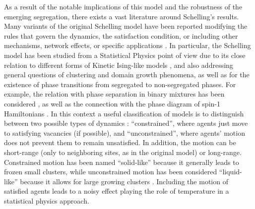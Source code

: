 As a result of the notable implications of this model and the robustness of the emerging segregation, there exists a vast literature around Schelling's results. Many variants of the original Schelling model have been reported modifying the rules that govern the dynamics, the satisfaction condition, or including other mechanisms, network effects, or specific applications \cite{Vinkovic,stauffer-2007,Dall_Asta_2008,gracia-lazaro-2009,Gauvin_2009,Gauvin_2010,domic-2011,henry-2011,unified,Interfacial_roughening,stauffer-2013,lenormand-2015,barmpalias-2018,jensen-2018,holden-2019,sert-2020,agarwal-2020,vieira-2020,ortega-2021,ortega-2021.2}. In particular, the Schelling model has been studied from a Statistical Physics point of view due to its close relation to different forms of Kinetic Ising-like models \cite{stauffer-2007,stauffer-2013}, and also addressing general questions of clustering and domain growth phenomena, as well as for the existence of phase transitions from segregated to non-segregated phases. For example, the relation with phase separation in binary mixtures has been considered \cite{Dall_Asta_2008,Vinkovic}, as well as the connection with the phase diagram of spin-1 Hamiltonians \cite{BEG,BlumeCapel,Gauvin_2009,Gauvin_2010}.
In this context a useful classification of models is to distinguish between two possible types of dynamics \cite{Dall_Asta_2008}: ``constrained'', where agents just move to satisfying vacancies (if possible), and ``unconstrained'',  where agents' motion does not prevent them to remain unsatisfied. In addition, the motion can be short-range (only to neighboring sites, as in the original model) or long-range. Constrained motion has been named ``solid-like'' because it generally leads to frozen small clusters, while unconstrained motion has been considered ``liquid-like'' because it allows for large growing clusters \cite{Vinkovic}. Including the motion of satisfied agents leads to a noisy effect playing the role of temperature in a statistical physics approach. 


